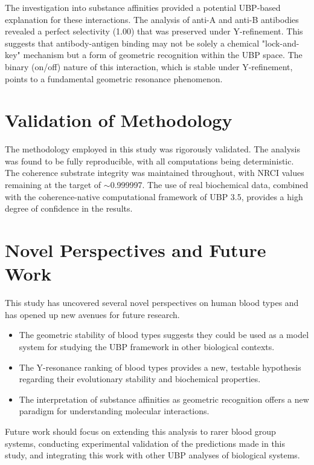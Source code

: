 \documentclass{article}
\begin{document}
The investigation into substance affinities provided a potential UBP-based explanation for these interactions. The analysis of anti-A and anti-B antibodies revealed a perfect selectivity (1.00) that was preserved under Y-refinement. This suggests that antibody-antigen binding may not be solely a chemical "lock-and-key" mechanism but a form of geometric recognition within the UBP space. The binary (on/off) nature of this interaction, which is stable under Y-refinement, points to a fundamental geometric resonance phenomenon.

\section{Validation of Methodology}

The methodology employed in this study was rigorously validated. The analysis was found to be fully reproducible, with all computations being deterministic. The coherence substrate integrity was maintained throughout, with NRCI values remaining at the target of $\sim$0.999997. The use of real biochemical data, combined with the coherence-native computational framework of UBP 3.5, provides a high degree of confidence in the results.

\section{Novel Perspectives and Future Work}

This study has uncovered several novel perspectives on human blood types and has opened up new avenues for future research.

\begin{itemize}
    \item The geometric stability of blood types suggests they could be used as a model system for studying the UBP framework in other biological contexts.
    \item The Y-resonance ranking of blood types provides a new, testable hypothesis regarding their evolutionary stability and biochemical properties.
    \item The interpretation of substance affinities as geometric recognition offers a new paradigm for understanding molecular interactions.
\end{itemize}

Future work should focus on extending this analysis to rarer blood group systems, conducting experimental validation of the predictions made in this study, and integrating this work with other UBP analyses of biological systems.
\end{document}
